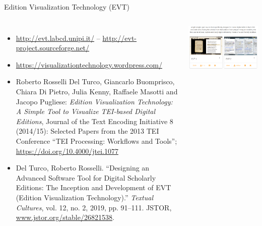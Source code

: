 \begin{frame}{Edition Visualization Technology (EVT)}

\begin{columns}
\begin{itemize}\scriptsize
    \item \protect\url{http://evt.labcd.unipi.it/} -- \protect\url{http://evt-project.sourceforge.net/}
    \item \protect\url{https://visualizationtechnology.wordpress.com/}
    \item Roberto Rosselli Del Turco, Giancarlo Buomprisco, Chiara Di Pietro, Julia Kenny, Raffaele Masotti and Jacopo Pugliese: \emph{Edition Visualization Technology: A Simple Tool to Visualize TEI-based Digital Editions}, Journal of the Text Encoding Initiative 8 (2014/15): Selected Papers from the 2013 TEI Conference “TEI Processing: Workflows and Tools”; \protect\url{https://doi.org/10.4000/jtei.1077}
    \item Del Turco, Roberto Rosselli. “Designing an Advanced Software Tool for Digital Scholarly Editions: The Inception and Development of EVT (Edition Visualization Technology).” \emph{Textual Cultures}, vol. 12, no. 2, 2019, pp. 91–111. JSTOR, \protect\url{www.jstor.org/stable/26821538}. 
\end{itemize}
\includegraphics[width=\textwidth]{img/evt-example.png}
\end{columns}



\end{frame}


